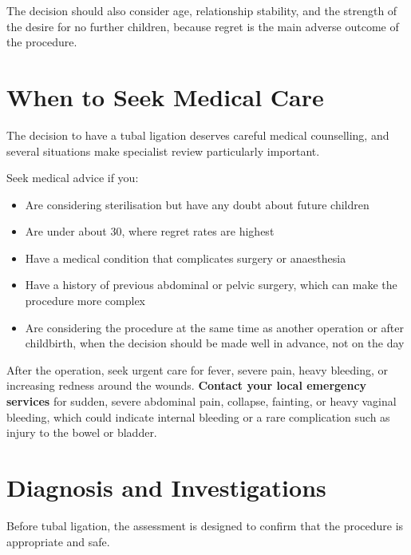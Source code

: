 The decision should also consider age, relationship stability, and the strength of the desire for no further children, because regret is the main adverse outcome of the procedure.

\section*{When to Seek Medical Care}
The decision to have a tubal ligation deserves careful medical counselling, and several situations make specialist review particularly important.

Seek medical advice if you:
\begin{itemize}
    \item Are considering sterilisation but have any doubt about future children
    \item Are under about 30, where regret rates are highest
    \item Have a medical condition that complicates surgery or anaesthesia
    \item Have a history of previous abdominal or pelvic surgery, which can make the procedure more complex
    \item Are considering the procedure at the same time as another operation or after childbirth, when the decision should be made well in advance, not on the day
\end{itemize}

After the operation, seek urgent care for fever, severe pain, heavy bleeding, or increasing redness around the wounds. \textbf{Contact your local emergency services} for sudden, severe abdominal pain, collapse, fainting, or heavy vaginal bleeding, which could indicate internal bleeding or a rare complication such as injury to the bowel or bladder.

\section*{Diagnosis and Investigations}
Before tubal ligation, the assessment is designed to confirm that the procedure is appropriate and safe.


